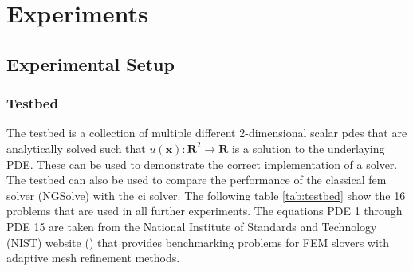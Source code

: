 \documentclass[./\jobname.tex]{subfiles}
\begin{document}
\chapter{Experiments}

\section{Experimental Setup}

\subsection{Testbed}
The testbed is a collection of multiple different 2-dimensional scalar \gls{pde}s that are analytically solved such that $u(\mathbf{x}): \mathbf{R}^2 \rightarrow \mathbf{R}$ is a solution to the underlaying PDE. These can be used to demonstrate the correct implementation of a solver. The testbed can also be used to compare the performance of the classical \gls{fem} solver (NGSolve) with the \gls{ci} solver. The following table \ref{tab:testbed} show the 16 problems that are used in all further experiments. The equations PDE 1 through PDE 15 are taken from the National Institute of Standards and Technology (NIST) website (\cite{mitchell_nist_2018}) that provides benchmarking problems for FEM slovers with adaptive mesh refinement methods.
\end{document}
